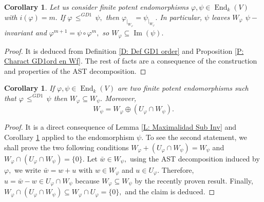 \documentclass[10pt,a4paper]{amsart}
\newtheorem{cor}[defn]{Corollary}
\theoremstyle{plain}
\theoremstyle{remark}
\numberwithin{equation}{section} \numberwithin{defn}{section}
\newcommand\ed{\operatorname{End}}
\newcommand{\Img}{\operatorname{Im}}
\newcommand{\f}{\varphi}
\newcommand{\g}{\psi}
\begin{document}
\begin{cor}\label{C: fyg coinciden en W GD1}
Let us consider finite potent endomorphisms $\f,\g \in \ed_k(V)$ with $i(\f)=m.$ If $\f \, \leq^{GD1} \, \g,$ then 
 $\f_{\vert_{W_{\f}}}=\g_{\vert_{W_{\f}}}.$ In particular, $\g$ leaves $W_{\f}$ $\g-$invariant and $\f^{m+1}=\g\circ \f^m,$ so $W_{\f}\subseteq \Img(\g).$
\end{cor}
\begin{proof}
It is deduced from Definition \ref{D: Def GD1 order} and Proposition \ref{P: Charact GD1ord en Wf}. The rest of facts are a consequence of the construction and properties of the AST decomposition.
\end{proof}



\begin{cor}\label{C: Wf en Wg}
If $\f, \g \in \ed_k(V)$ are two finite potent endomorphisms such that $\f \, \leq^{GD1} \, \g$ then $W_{\f}\subseteq W_{\g}.$ Moreover, $$W_{\g}=W_{\f}\oplus (U_{\f}\cap W_{\g}). $$
\end{cor}
\begin{proof}
It is a direct consequence of Lemma \ref{L: Maximalidad Sub Inv} and Corollary \ref{C: fyg coinciden en W GD1} applied to the endomorphism $\g$. To see the second statement, we shall prove the two following conditions $W_{\f}+(U_{\f}\cap W_{\g})=W_{\g}$ and $W_{\f}\cap (U_{\f}\cap W_{\g})=\{ 0 \}.$ Let $\bar{w}\in W_{\g},$ using the AST decomposition induced by $\f,$ we  write $\bar{w}=w+u$ with $w\in W_{\f}$ and $u\in U_{\f}.$ Therefore, $u=\bar{w}-w\in U_{\f}\cap W_{\g}$ because $W_{\f}\subseteq W_{\g}$ by the recently proven result. Finally, $W_{\f}\cap (U_{\f}\cap W_{\g})\subseteq W_{\f}\cap U_{\f                                                                                                                                      }=\{ 0\},$ and the claim is deduced.
\end{proof}
\end{document}
